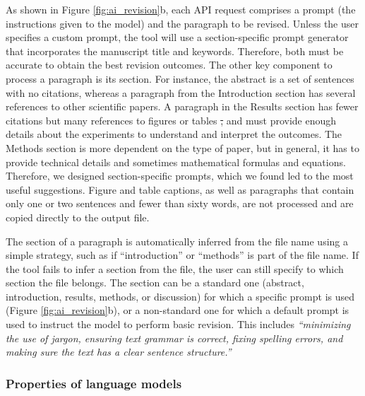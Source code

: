 \documentclass[
]{article}
\providecommand{\DIFdeltex}[1]{{\protect\color{red}\sout{#1}}}                      %
\providecommand{\DIFdelbegin}{} %
\providecommand{\DIFdelend}{} %
\providecommand{\DIFdel}[1]{\texorpdfstring{\DIFdeltex{#1}}{}} %
\newcommand{\DIFscaledelfig}{0.5}
\newlength{\DIFdelgraphicswidth} %
\newlength{\DIFdelgraphicsheight} %
\newcommand{\DIFdelincludegraphics}[2][]{%
\sbox{\DIFdelgraphicsbox}{\DIFOincludegraphics[#1]{#2}}%
\settoboxwidth{\DIFdelgraphicswidth}{\DIFdelgraphicsbox} %
\settoboxtotalheight{\DIFdelgraphicsheight}{\DIFdelgraphicsbox} %
\scalebox{\DIFscaledelfig}{%
\parbox[b]{\DIFdelgraphicswidth}{\usebox{\DIFdelgraphicsbox}\\[-\baselineskip] \rule{\DIFdelgraphicswidth}{0em}}\llap{\resizebox{\DIFdelgraphicswidth}{\DIFdelgraphicsheight}{%
\setlength{\unitlength}{\DIFdelgraphicswidth}%
\begin{picture}(1,1)%
\thicklines\linethickness{2pt} %
{\color[rgb]{1,0,0}\put(0,0){\framebox(1,1){}}}%
{\color[rgb]{1,0,0}\put(0,0){\line( 1,1){1}}}%
{\color[rgb]{1,0,0}\put(0,1){\line(1,-1){1}}}%
\end{picture}%
}\hspace*{3pt}}} %
} %
\DeclareRobustCommand{\DIFdelbegin}{\DIFOdelbegin \let\includegraphics\DIFdelincludegraphics} %
\DeclareRobustCommand{\DIFdelend}{\DIFOaddend \let\includegraphics\DIFOincludegraphics} %
\begin{document}
As shown in Figure \ref{fig:ai_revision}b, each API request comprises a prompt (the instructions given to the model) and the paragraph to be revised.
Unless the user specifies a custom prompt, the tool will use a section-specific prompt generator that incorporates the manuscript title and keywords.
Therefore, both must be accurate to obtain the best revision outcomes.
The other key component to process a paragraph is its section.
For instance, the abstract is a set of sentences with no citations, whereas a paragraph from the Introduction section has several references to other scientific papers.
A paragraph in the Results section has fewer citations but many references to figures or tables \DIFdelbegin \DIFdel{, }\DIFdelend and must provide enough details about the experiments to understand and interpret the outcomes.
The Methods section is more dependent on the type of paper, but in general, it has to provide technical details and sometimes mathematical formulas and equations.
Therefore, we designed section-specific prompts, which we found led to the most useful suggestions.
Figure and table captions, as well as paragraphs that contain only one or two sentences and fewer than sixty words, are not processed and are copied directly to the output file.

The section of a paragraph is automatically inferred from the file name using a simple strategy, such as if ``introduction'' or ``methods'' is part of the file name.
If the tool fails to infer a section from the file, the user can still specify to which section the file belongs.
The section can be a standard one (abstract, introduction, results, methods, or discussion) for which a specific prompt is used (Figure \ref{fig:ai_revision}b), or a non-standard one for which a default prompt is used to instruct the model to perform basic revision.
This includes \emph{``minimizing the use of jargon, ensuring text grammar is correct, fixing spelling errors, and making sure the text has a clear sentence structure.''}

\subsubsection{Properties of language models}
\end{document}

